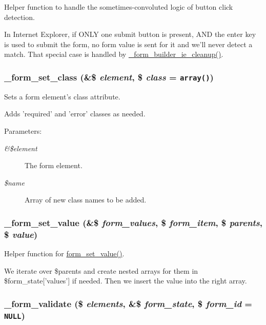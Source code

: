 Helper function to handle the sometimes-convoluted logic of button click detection.

In Internet Explorer, if ONLY one submit button is present, AND the enter key is used to submit the form, no form value is sent for it and we'll never detect a match. That special case is handled by \hyperlink{group__form__api_g7d997b259e62894fbfd69e9c4efcab99}{\_\-form\_\-builder\_\-ie\_\-cleanup()}. \hypertarget{group__form__api_gc8800bdf25db7c100ccf2fd0dcbb25f0}{
\subsubsection[{\_\-form\_\-set\_\-class}]{\setlength{\rightskip}{0pt plus 5cm}\_\-form\_\-set\_\-class (\&\$ {\em element}, \/  \$ {\em class} = {\tt array()})}}
\label{group__form__api_gc8800bdf25db7c100ccf2fd0dcbb25f0}


Sets a form element's class attribute.

Adds 'required' and 'error' classes as needed.

\begin{Desc}
\item[Parameters:]
\begin{description}
\item[{\em \&\$element}]The form element. \item[{\em \$name}]Array of new class names to be added. \end{description}
\end{Desc}
\hypertarget{group__form__api_gc11df4fae902c9f1d9f5aefd1ddb9a13}{
\subsubsection[{\_\-form\_\-set\_\-value}]{\setlength{\rightskip}{0pt plus 5cm}\_\-form\_\-set\_\-value (\&\$ {\em form\_\-values}, \/  \$ {\em form\_\-item}, \/  \$ {\em parents}, \/  \$ {\em value})}}
\label{group__form__api_gc11df4fae902c9f1d9f5aefd1ddb9a13}


Helper function for \hyperlink{group__form__api_ga7635bbcb1cb510fcc0cdc265e9ddea7}{form\_\-set\_\-value()}.

We iterate over \$parents and create nested arrays for them in \$form\_\-state\mbox{[}'values'\mbox{]} if needed. Then we insert the value into the right array. \hypertarget{group__form__api_g34ca9a4baf78b6f550e792893c4dfda9}{
\subsubsection[{\_\-form\_\-validate}]{\setlength{\rightskip}{0pt plus 5cm}\_\-form\_\-validate (\$ {\em elements}, \/  \&\$ {\em form\_\-state}, \/  \$ {\em form\_\-id} = {\tt NULL})}}
\label{group__form__api_g34ca9a4baf78b6f550e792893c4dfda9}


